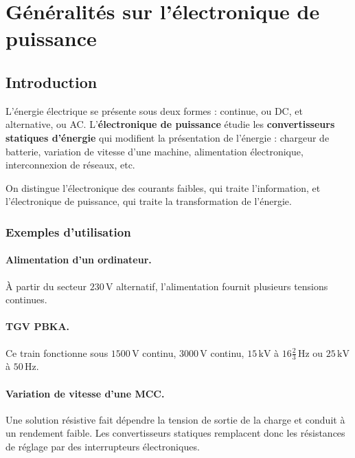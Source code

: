 \section{Généralités sur l'électronique de puissance}

\subsection{Introduction}
L'énergie électrique se présente sous deux formes : continue, ou DC, et alternative, ou AC. L'\textbf{électronique de puissance} étudie les \textbf{convertisseurs statiques d'énergie} qui modifient la présentation de l'énergie : chargeur de batterie, variation de vitesse d'une machine, alimentation électronique, interconnexion de réseaux, etc.

On distingue l'électronique des courants faibles, qui traite l'information, et l'électronique de puissance, qui traite la transformation de l'énergie.

\begin{center}\TLChaineConvertisseursPuissance\end{center}

\subsubsection*{Exemples d'utilisation}
\paragraph{Alimentation d'un ordinateur.} À partir du secteur $230\,\mathrm{V}$ alternatif, l'alimentation fournit plusieurs tensions continues.

\paragraph{TGV PBKA.} Ce train fonctionne sous $1500\,\mathrm{V}$ continu, $3000\,\mathrm{V}$ continu, $15\,\mathrm{kV}$ à $16\tfrac{2}{3}\,\mathrm{Hz}$ ou $25\,\mathrm{kV}$ à $50\,\mathrm{Hz}$.

\paragraph{Variation de vitesse d'une MCC.} Une solution résistive fait dépendre la tension de sortie de la charge et conduit à un rendement faible. Les convertisseurs statiques remplacent donc les résistances de réglage par des interrupteurs électroniques.

